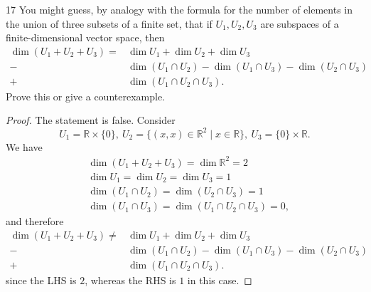 \documentclass[11pt]{extarticle}
\newenvironment{problem}[1]{\begin{prob*}{#1}{}}{\end{prob*}}
\newcommand{\R}{\mathbb{R}}
\begin{document}
\begin{problem}{17}
You might guess, by analogy with the formula for the number of elements in the union of three subsets of a finite set, that if $U_1,U_2,U_3$ are subspaces of a finite-dimensional vector space, then
\begin{align*}
\dim(U_1+ U_2 + U_3) = &\dim U_1 + \dim U_2 + \dim U_3\\
 			              -&\dim(U_1\cap U_2) - \dim(U_1\cap U_3) - \dim(U_2\cap U_3)\\
			               + &\dim(U_1\cap U_2 \cap U_3).
\end{align*}
Prove this or give a counterexample.
\end{problem}
\begin{proof}
The statement is false.  Consider
\begin{equation*}
U_1 = \R \times\{0\}, ~ U_2 = \{(x, x)\in\R^2\mid x\in\R\}, ~ U_3 = \{0\}\times\R.
\end{equation*}
We have
\begin{align*}
&\dim(U_1 + U_2 + U_3) = \dim\R^2 = 2\\
&\dim U_1 = \dim U_2 = \dim U_3 = 1\\
&\dim(U_1\cap U_2) = \dim(U_2\cap U_3) = 1\\
&\dim(U_1\cap U_3) = \dim(U_1\cap U_2\cap U_3) = 0,
\end{align*}
and therefore 
\begin{align*}
\dim(U_1+ U_2 + U_3) \neq &\dim U_1 + \dim U_2 + \dim U_3\\
 			              -&\dim(U_1\cap U_2) - \dim(U_1\cap U_3) - \dim(U_2\cap U_3)\\
			               + &\dim(U_1\cap U_2 \cap U_3).
\end{align*}
since the LHS is $2$, whereas the RHS is $1$ in this case.
\end{proof}
\end{document}
